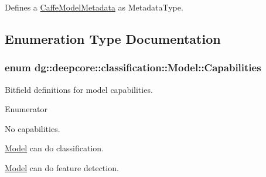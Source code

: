 Defines a \hyperlink{structdg_1_1deepcore_1_1classification_1_1_caffe_model_metadata}{Caffe\+Model\+Metadata} as Metadata\+Type. 



\subsection{Enumeration Type Documentation}
\subsubsection[{\texorpdfstring{Capabilities}{Capabilities}}]{\setlength{\rightskip}{0pt plus 5cm}enum {\bf dg\+::deepcore\+::classification\+::\+Model\+::\+Capabilities}}\hypertarget{group___classification_module_gabbae0a103af9e91d0afd0d4cc84b2be4}{}\label{group___classification_module_gabbae0a103af9e91d0afd0d4cc84b2be4}


Bitfield definitions for model capabilities. 

\begin{Desc}
\item[Enumerator]\par
\begin{description}
\item[{\em 
N\+O\+NE\hypertarget{group___classification_module_gabbae0a103af9e91d0afd0d4cc84b2be4a838741fba7c255fdffa269b273e44c92}{}\label{group___classification_module_gabbae0a103af9e91d0afd0d4cc84b2be4a838741fba7c255fdffa269b273e44c92}
}]No capabilities. \item[{\em 
C\+L\+A\+S\+S\+I\+FY\hypertarget{group___classification_module_gabbae0a103af9e91d0afd0d4cc84b2be4a13687c08a2521fc80da6f22a7b4c92b0}{}\label{group___classification_module_gabbae0a103af9e91d0afd0d4cc84b2be4a13687c08a2521fc80da6f22a7b4c92b0}
}]\hyperlink{classdg_1_1deepcore_1_1classification_1_1_model}{Model} can do classification. \item[{\em 
D\+E\+T\+E\+CT\hypertarget{group___classification_module_gabbae0a103af9e91d0afd0d4cc84b2be4a09546973ad0cbf6121791eaafaf279a0}{}\label{group___classification_module_gabbae0a103af9e91d0afd0d4cc84b2be4a09546973ad0cbf6121791eaafaf279a0}
}]\hyperlink{classdg_1_1deepcore_1_1classification_1_1_model}{Model} can do feature detection. \end{description}
\end{Desc}
